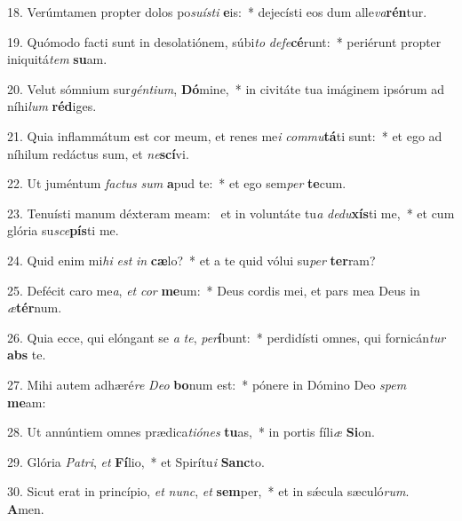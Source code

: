 18. Verúmtamen propter dolos po\textit{su}\textit{ís}\textit{ti} \textbf{e}is:~*  dejecísti eos dum alle\textit{va}\textbf{rén}tur.\

19. Quómodo facti sunt in desolatiónem, súbi\textit{to} \textit{de}\textit{fe}\textbf{cé}runt:~*  periérunt propter iniquitá\textit{tem} \textbf{su}am.\

20. Velut sómnium sur\textit{gén}\textit{ti}\textit{um}, \textbf{Dó}mine,~*  in civitáte tua imáginem ipsórum ad níhi\textit{lum} \textbf{réd}iges.\

21. Quia inflammátum est cor meum, et renes me\textit{i} \textit{com}\textit{mu}\textbf{tá}ti sunt:~*  et ego ad níhilum redáctus sum, et \textit{ne}\textbf{scí}vi.\

22. Ut juméntum \textit{fac}\textit{tus} \textit{sum} \textbf{a}pud te:~*  et ego sem\textit{per} \textbf{te}cum.\

23. Tenuísti manum déxteram meam: \dag\  et in voluntáte tu\textit{a} \textit{de}\textit{du}\textbf{xís}ti me,~*  et cum glória su\textit{sce}\textbf{pís}ti me.\

24. Quid enim mi\textit{hi} \textit{est} \textit{in} \textbf{cæ}lo?~*  et a te quid vólui su\textit{per} \textbf{ter}ram?\

25. Defécit caro me\textit{a}, \textit{et} \textit{cor} \textbf{me}um:~*  Deus cordis mei, et pars mea Deus in \textit{æ}\textbf{tér}num.\

26. Quia ecce, qui elóngant se \textit{a} \textit{te}, \textit{per}\textbf{í}bunt:~*  perdidísti omnes, qui fornicán\textit{tur} \textbf{abs} te.\

27. Mihi autem adhæré\textit{re} \textit{De}\textit{o} \textbf{bo}num est:~*  pónere in Dómino Deo \textit{spem} \textbf{me}am:\

28. Ut annúntiem omnes prædica\textit{ti}\textit{ó}\textit{nes} \textbf{tu}as,~*  in portis fíli\textit{æ} \textbf{Si}on.\

29. Glória \textit{Pa}\textit{tri}, \textit{et} \textbf{Fí}lio,~*  et Spirítu\textit{i} \textbf{Sanc}to.\

30. Sicut erat in princípio, \textit{et} \textit{nunc}, \textit{et} \textbf{sem}per,~*  et in sǽcula sæculó\textit{rum}. \textbf{A}men.\

